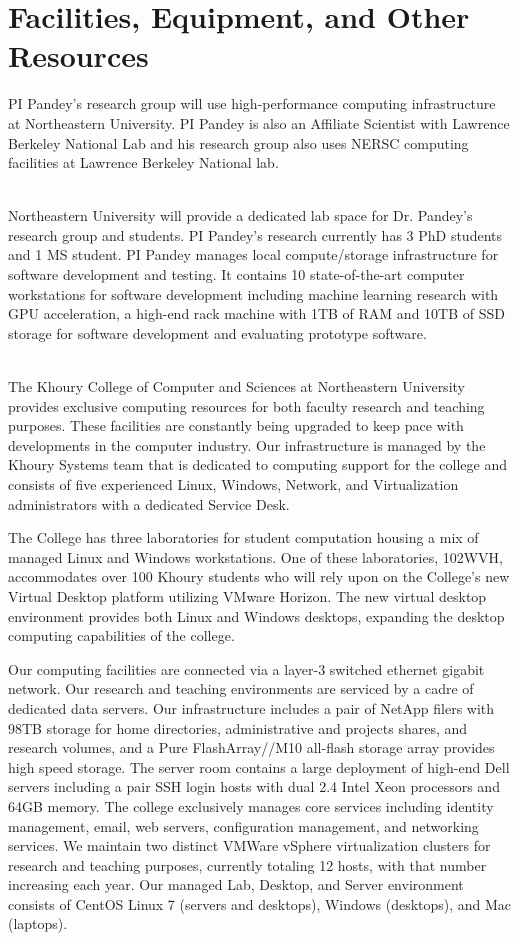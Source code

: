 \section*{Facilities, Equipment, and Other Resources}

PI Pandey's research group will use high-performance computing infrastructure at Northeastern University. PI Pandey is also an Affiliate Scientist with Lawrence Berkeley National Lab and his research group also uses NERSC computing facilities at Lawrence Berkeley National lab.

\\
\noindent
Northeastern University will provide a dedicated lab space for Dr. Pandey’s research group and students. PI Pandey's research currently has 3 PhD students and 1 MS student. PI Pandey manages local compute/storage infrastructure for software development and testing. It contains 10 state-of-the-art computer workstations for software development including machine learning research with GPU acceleration, a high-end rack machine with 1TB of RAM and 10TB of SSD storage for software development and evaluating prototype software. 

\\
\noindent
The Khoury College of Computer and Sciences at Northeastern University provides exclusive computing resources for both faculty research and teaching purposes. These facilities are constantly being upgraded to keep pace with developments in the computer industry. Our infrastructure is managed by the Khoury Systems team that is dedicated to computing support for the college and consists of five experienced Linux, Windows, Network, and Virtualization administrators with a dedicated Service Desk.

The College has three laboratories for student computation housing a mix of managed Linux and Windows workstations. One of these laboratories, 102WVH, accommodates over 100 Khoury students who will rely upon on the College’s new Virtual Desktop platform utilizing VMware Horizon. The new virtual desktop environment provides both Linux and Windows desktops, expanding the desktop computing capabilities of the college. 

Our computing facilities are connected via a layer-3 switched ethernet gigabit network. Our research and teaching environments are serviced by a cadre of dedicated data servers. Our infrastructure includes a pair of NetApp filers with 98TB storage for home directories, administrative and projects shares, and research volumes, and a Pure FlashArray//M10 all-flash storage array provides high speed storage. The server room contains a large deployment of high-end Dell servers including a pair SSH login hosts with dual 2.4 Intel Xeon processors and 64GB memory. The college exclusively manages core services including identity management, email, web servers, configuration management, and networking services. We maintain two distinct VMWare vSphere virtualization clusters for research and teaching purposes, currently totaling 12 hosts, with that number increasing each year. Our managed Lab, Desktop, and Server environment consists of CentOS Linux 7 (servers and desktops), Windows (desktops), and Mac (laptops).

